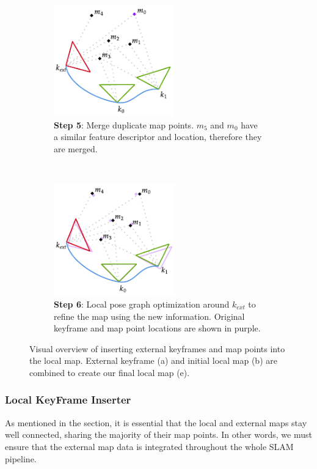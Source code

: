 \begin{figure}[h]
\begin{subfigure}[t]{0.333\textwidth}
    \end{subfigure}%
    ~
    \begin{subfigure}[t]{0.333\textwidth}
        \centering
        \includegraphics[height=1.9in]{figures/external_key_frame_insertion_4.pdf}
        \caption{\textbf{Step 5}: Merge duplicate map points. $m_5$ and $m_0$ have a similar feature descriptor and location, therefore they are merged.}
    \end{subfigure}%
    ~
    \begin{subfigure}[t]{0.333\textwidth}
        \centering
        \includegraphics[height=1.9in]{figures/external_key_frame_insertion_5.pdf}
        \caption{\textbf{Step 6}: Local pose graph optimization around $k_{ext}$ to refine the map using the new information. Original keyframe and map point locations are shown in purple.}
    \end{subfigure}%

    \caption{Visual overview of inserting external keyframes and map points into the local map. External keyframe (a) and initial local map (b) are combined to create our final local map (e).}
    \label{fig:external-keyframe-inserter}

\end{figure}


\subsubsection{Local KeyFrame Inserter}
\label{sec:local-key-frame-inserter}
As mentioned in the  section, it is essential that the local and external maps stay well connected, sharing the majority of their map points. In other words, we must ensure that the external map data is integrated throughout the whole SLAM pipeline.

